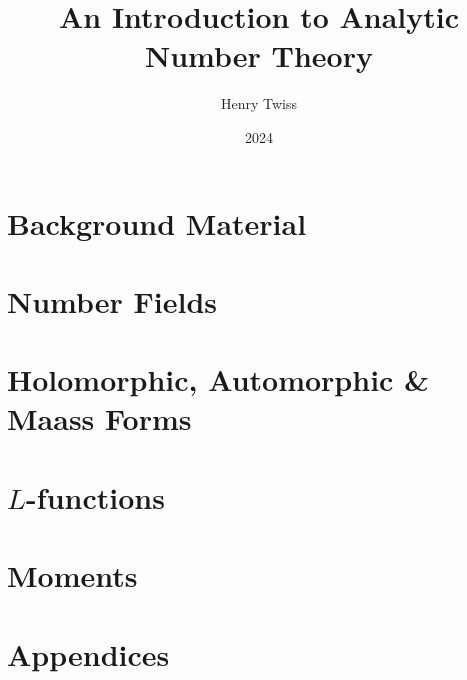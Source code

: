 \documentclass[12pt,oneside]{book}
\title{An Introduction to Analytic Number Theory}
\author{Henry Twiss}
\date{2024}
\begin{document}
\maketitle
\pagestyle{empty}
\tableofcontents
\setcounter{page}{0}
\pagestyle{fancy}

\part{Background Material}
  

\part{Number Fields}
  

\part{Holomorphic, Automorphic \& Maass Forms}
  
  
  
  

\part{\texorpdfstring{$L$}{L}-functions}
  
  
  

\part{Moments}
  
  

\part{Appendices}
  

\printindex


\end{document}
